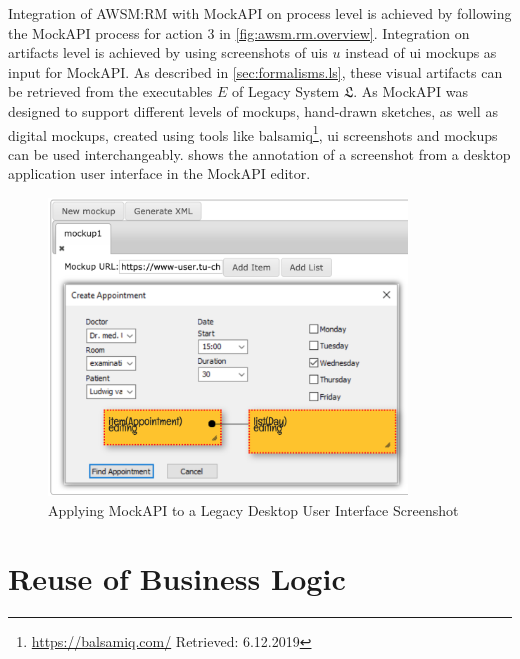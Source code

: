 Integration of AWSM:RM with MockAPI on process level is achieved by following the MockAPI process for action 3 in \cref{fig:awsm.rm.overview}.
Integration on \glspl{artifact} level is achieved by using screenshots of  \glspl{ui} \(u\) instead of \gls{ui} mockups as input for MockAPI.
As described in \cref{sec:formalisms.ls}, these visual \glspl{artifact} can be retrieved from the executables \(E\) of \gls{Legacy System} \(\mathfrak{L}\).
As MockAPI was designed to support different levels of mockups, hand-drawn sketches, as well as digital mockups, created using tools like balsamiq\footnote{\url{https://balsamiq.com/} Retrieved: 6.12.2019},  \gls{ui} screenshots and mockups can be used interchangeably.
 shows the annotation of a screenshot from a  desktop application user interface in the MockAPI editor.

\begin{figure}[h!]
\hypertarget{fig:mockapi-screenshot}{%
\centering
\includegraphics[width=0.85\textwidth]{../figures/screenshots/mockapi2.png}
\caption{Applying MockAPI to a Legacy Desktop User Interface Screenshot}\label{fig:mockapi-screenshot}
}
\end{figure}

\vspace{-15pt}
\hypertarget{sec:rewamp}{%
\section{Reuse of Business Logic}\label{sec:rewamp}}
\vspace{15pt}

